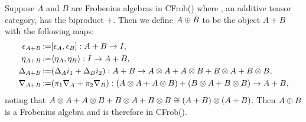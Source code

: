 \begin{lemma}\label{prop:biproducts-of-frobenius-objects-are-frobenius}
  Suppose $A$ and $B$ are Frobenius algebras in CFrob(\X) where \X, an additive tensor category, has
  the biproduct $+$. Then we  define $A\oplus B$ to be the object $A+B$ with the following
  maps:
  \begin{align*}
    \epsilon_{A+B} &\operatorname*{:\!=} [\epsilon_A,\epsilon_B]:A+B \to I,\\
    \eta_{A+B}&\operatorname*{:\!=} \langle\eta_A,\eta_B\rangle:I\to A+B,\\
    \Delta_{A+B} & \operatorname*{:\!=} (\Delta_A i_1 + \Delta_B i_2):A+B\to A\otimes A+A\otimes B+B\otimes A+B\otimes B,\\
    \nabla_{A+B} & \operatorname*{:\!=} (\pi_1 \nabla_A + \pi_2 \nabla_B): (A\otimes A+A\otimes B)+(B\otimes A+B\otimes B) \to A+B,
  \end{align*}
  noting that $A\otimes A+A\otimes B+B\otimes A+B\otimes B \cong (A+B)\otimes(A+B)$.
  Then $A\oplus B$ is a Frobenius algebra and is therefore in CFrob(\X).
\end{lemma}
